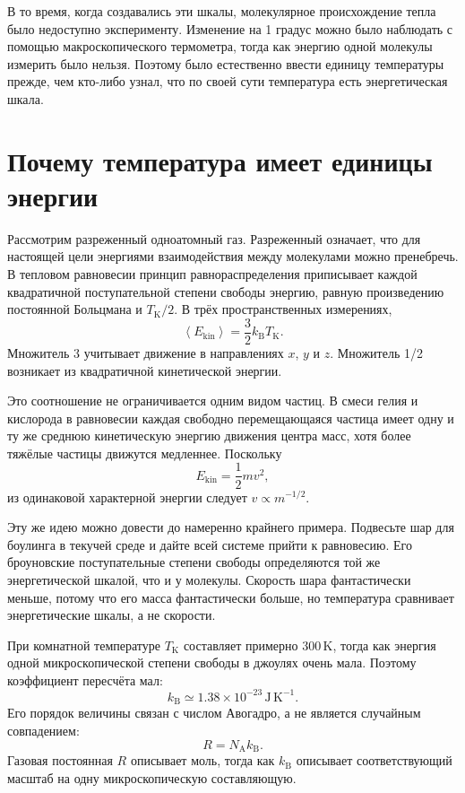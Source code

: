 В то время, когда создавались эти шкалы, молекулярное происхождение тепла было недоступно эксперименту. Изменение на 1 градус можно было наблюдать с помощью макроскопического термометра, тогда как энергию одной молекулы измерить было нельзя. Поэтому было естественно ввести единицу температуры прежде, чем кто-либо узнал, что по своей сути температура есть энергетическая шкала.

\section{Почему температура имеет единицы энергии}

Рассмотрим разреженный одноатомный газ. Разреженный означает, что для настоящей цели энергиями взаимодействия между молекулами можно пренебречь. В тепловом равновесии принцип равнораспределения приписывает каждой квадратичной поступательной степени свободы энергию, равную произведению постоянной Больцмана и \(T_{\mathrm K}/2\). В трёх пространственных измерениях,
\begin{equation}
 \left\langle E_{\mathrm{kin}}\right\rangle
 =\frac{3}{2}k_{\mathrm B}T_{\mathrm K}.
 \label{eq:sm2-equipartition-kelvin}
\end{equation}
Множитель 3 учитывает движение в направлениях \(x\), \(y\) и \(z\). Множитель 1/2 возникает из квадратичной кинетической энергии.

Это соотношение не ограничивается одним видом частиц. В смеси гелия и кислорода в равновесии каждая свободно перемещающаяся частица имеет одну и ту же среднюю кинетическую энергию движения центра масс, хотя более тяжёлые частицы движутся медленнее. Поскольку
\begin{equation}
 E_{\mathrm{kin}}=\frac{1}{2}mv^2,
\end{equation}
из одинаковой характерной энергии следует \(v\propto m^{-1/2}\).

Эту же идею можно довести до намеренно крайнего примера. Подвесьте шар для боулинга в текучей среде и дайте всей системе прийти к равновесию. Его броуновские поступательные степени свободы определяются той же энергетической шкалой, что и у молекулы. Скорость шара фантастически меньше, потому что его масса фантастически больше, но температура сравнивает энергетические шкалы, а не скорости.

При комнатной температуре \(T_{\mathrm K}\) составляет примерно \(300\,\mathrm K\), тогда как энергия одной микроскопической степени свободы в джоулях очень мала. Поэтому коэффициент пересчёта мал:
\begin{equation}
 k_{\mathrm B}\simeq 1.38\times10^{-23}\,
 \mathrm{J\,K^{-1}}.
 \label{eq:sm2-boltzmann-value}
\end{equation}
Его порядок величины связан с числом Авогадро, а не является случайным совпадением:
\begin{equation}
 R=N_{\mathrm A}k_{\mathrm B}.
\end{equation}
Газовая постоянная \(R\) описывает моль, тогда как \(k_{\mathrm B}\) описывает соответствующий масштаб на одну микроскопическую составляющую.

